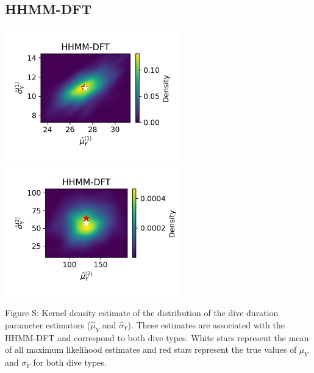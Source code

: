 \documentclass{article}
\begin{document}
        \subsection{HHMM-DFT}
        \begin{center}
        \includegraphics[width=3in]{../Plots/hhmm_FV_uncorr_MLE_density_dive_duration_-1_0.png}
        \includegraphics[width=3in]{../Plots/hhmm_FV_uncorr_MLE_density_dive_duration_-1_1.png}
        \end{center}

        \noindent Figure S: Kernel density estimate of the distribution of the dive duration parameter estimators ($\hat \mu_Y$ and $\hat \sigma_Y$). These estimates are associated with the HHMM-DFT and correspond to both dive types. White stars represent the mean of all maximum likelihood estimates and red stars represent the true values of $\mu_Y$ and $\sigma_Y$ for both dive types.
        \addtocounter{fignum}{1}
        
\end{document}
